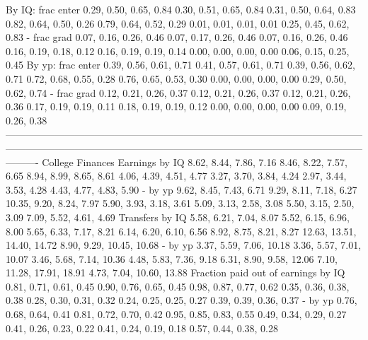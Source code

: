                      By IQ: frac enter       0.29, 0.50, 0.65, 0.84      0.30, 0.51, 0.65, 0.84   0.31, 0.50, 0.64, 0.83    0.82, 0.64, 0.50, 0.26    0.79, 0.64, 0.52, 0.29      0.01, 0.01, 0.01, 0.01    0.25, 0.45, 0.62, 0.83
                           - frac grad       0.07, 0.16, 0.26, 0.46      0.07, 0.17, 0.26, 0.46   0.07, 0.16, 0.26, 0.46    0.16, 0.19, 0.18, 0.12    0.16, 0.19, 0.19, 0.14      0.00, 0.00, 0.00, 0.00    0.06, 0.15, 0.25, 0.45
                     By yp: frac enter       0.39, 0.56, 0.61, 0.71      0.41, 0.57, 0.61, 0.71   0.39, 0.56, 0.62, 0.71    0.72, 0.68, 0.55, 0.28    0.76, 0.65, 0.53, 0.30      0.00, 0.00, 0.00, 0.00    0.29, 0.50, 0.62, 0.74
                           - frac grad       0.12, 0.21, 0.26, 0.37      0.12, 0.21, 0.26, 0.37   0.12, 0.21, 0.26, 0.36    0.17, 0.19, 0.19, 0.11    0.18, 0.19, 0.19, 0.12      0.00, 0.00, 0.00, 0.00    0.09, 0.19, 0.26, 0.38
----------------------------------------------------------------------------------------------------------------------------------------------------------------------------------------------------------------------------------
                      College Finances                                                                                                                                                                                            
                        Earnings by IQ       8.62, 8.44, 7.86, 7.16      8.46, 8.22, 7.57, 6.65   8.94, 8.99, 8.65, 8.61    4.06, 4.39, 4.51, 4.77    3.27, 3.70, 3.84, 4.24      2.97, 3.44, 3.53, 4.28    4.43, 4.77, 4.83, 5.90
                               - by yp       9.62, 8.45, 7.43, 6.71      9.29, 8.11, 7.18, 6.27  10.35, 9.20, 8.24, 7.97    5.90, 3.93, 3.18, 3.61    5.09, 3.13, 2.58, 3.08      5.50, 3.15, 2.50, 3.09    7.09, 5.52, 4.61, 4.69
                       Transfers by IQ       5.58, 6.21, 7.04, 8.07      5.52, 6.15, 6.96, 8.00   5.65, 6.33, 7.17, 8.21    6.14, 6.20, 6.10, 6.56    8.92, 8.75, 8.21, 8.27  12.63, 13.51, 14.40, 14.72  8.90, 9.29, 10.45, 10.68
                               - by yp      3.37, 5.59, 7.06, 10.18     3.36, 5.57, 7.01, 10.07  3.46, 5.68, 7.14, 10.36    4.48, 5.83, 7.36, 9.18   6.31, 8.90, 9.58, 12.06   7.10, 11.28, 17.91, 18.91  4.73, 7.04, 10.60, 13.88
   Fraction paid out of earnings by IQ       0.81, 0.71, 0.61, 0.45      0.90, 0.76, 0.65, 0.45   0.98, 0.87, 0.77, 0.62    0.35, 0.36, 0.38, 0.38    0.28, 0.30, 0.31, 0.32      0.24, 0.25, 0.25, 0.27    0.39, 0.39, 0.36, 0.37
                               - by yp       0.76, 0.68, 0.64, 0.41      0.81, 0.72, 0.70, 0.42   0.95, 0.85, 0.83, 0.55    0.49, 0.34, 0.29, 0.27    0.41, 0.26, 0.23, 0.22      0.41, 0.24, 0.19, 0.18    0.57, 0.44, 0.38, 0.28

